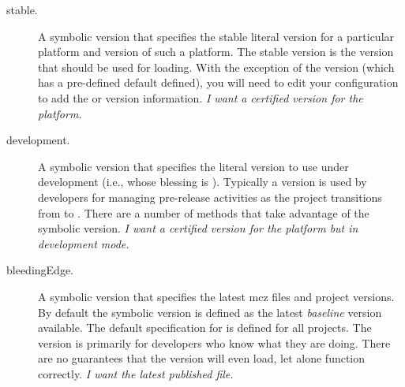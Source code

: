 \documentclass[a4paper,10pt,twoside]{book}
\begin{document}
\begin{description}
\item [stable.] A symbolic version that specifies the stable literal version for a particular platform and version of such a platform. The stable version is the version that should be used for loading. With the exception of the  version (which has a pre-defined default defined), you will need to edit your configuration to add the  or  version information. \emph{I want a certified version for the platform.}

\item [development.] A symbolic version that specifies the literal version to use under development (i.e., whose blessing is ). Typically a  version is used by developers for managing pre-release activities as the project transitions from  to . There are a number of  methods that take advantage of the  symbolic version. \emph{I want a certified version for the platform but in development mode.}



\item [bleedingEdge.]  A symbolic version that specifies the latest mcz files and project versions. By default the  symbolic version is defined as the latest \emph{baseline} version available. The default specification for  is defined for all projects. The  version is primarily for developers who know what they are doing. There are no guarantees that the  version will even load, let alone function correctly. \emph{I want the latest published file.}

\end{description}

\end{document}
